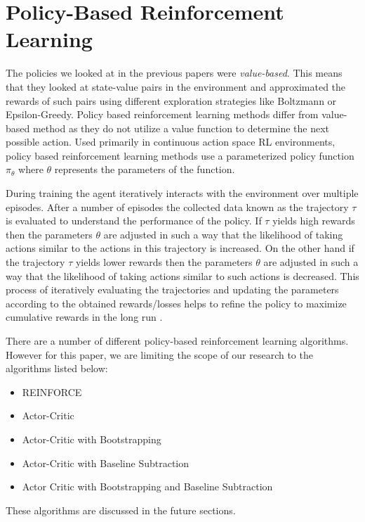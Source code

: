 \documentclass{article}
\begin{document}
\section{Policy-Based Reinforcement Learning}
The policies we looked at in the previous papers were \emph{value-based}. This means that they looked at state-value pairs in the environment and approximated the rewards of such pairs using different exploration strategies like Boltzmann or Epsilon-Greedy. Policy based reinforcement learning methods differ from value-based method as they do not utilize a value function to determine the next possible action. Used primarily in  continuous action space RL environments, policy based reinforcement learning methods use a parameterized policy function $\pi_\theta$ where $\theta$ represents the parameters of the function.
\par During training the agent iteratively interacts with the environment over multiple episodes. After a number of episodes the collected data known as the trajectory $\tau$ is evaluated to understand the performance of the policy. If $\tau$ yields high rewards then the parameters $\theta$ are adjusted in such a way that the likelihood of taking actions similar to the actions in this trajectory is increased. On the other hand if the trajectory $\tau$ yields lower rewards then the parameters $\theta$ are adjusted in such a way that the likelihood of taking actions similar to such actions is decreased. This process of iteratively evaluating the trajectories and updating the parameters according to the obtained rewards/losses helps to refine the policy to maximize cumulative rewards in the long run \cite{plaat-deeprl}. 
\par
There are a number of different policy-based reinforcement learning algorithms. However for this paper, we are limiting the scope of our research to the algorithms listed below: 

\begin{itemize}[itemsep=0pt]
\item REINFORCE
\item Actor-Critic
\item Actor-Critic with Bootstrapping
\item Actor-Critic with Baseline Subtraction
\item Actor Critic with Bootstrapping and Baseline Subtraction
\end{itemize}
These algorithms are discussed in the future sections. 
\end{document}
